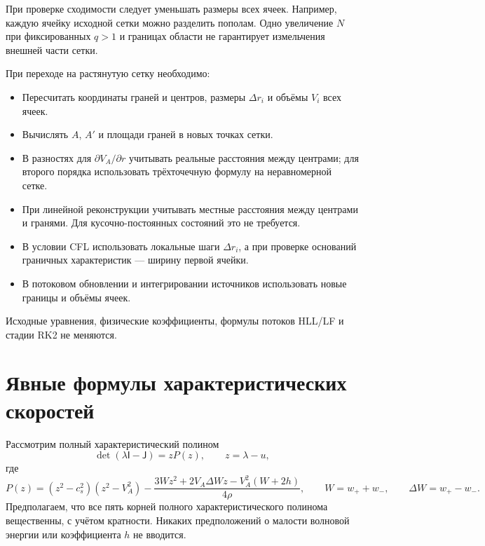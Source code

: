 \documentclass[11pt,a4paper]{article}
\begin{document}
При проверке сходимости следует уменьшать размеры
всех ячеек. Например, каждую ячейку исходной сетки
можно разделить пополам.
Одно увеличение $N$ при фиксированных $q>1$
и границах области не гарантирует измельчения
внешней части сетки.

При переходе на растянутую сетку необходимо:
\begin{itemize}
    \item Пересчитать координаты граней и центров,
    размеры $\Delta r_i$ и объёмы $V_i$ всех ячеек.

    \item Вычислять $A$, $A'$ и площади граней
    в новых точках сетки.

    \item В разностях для $\partial V_A/\partial r$
    учитывать реальные расстояния между центрами;
    для второго порядка использовать трёхточечную
    формулу на неравномерной сетке.

    \item При линейной реконструкции учитывать
    местные расстояния между центрами и гранями.
    Для кусочно-постоянных состояний это не требуется.

    \item В условии CFL использовать локальные шаги
    $\Delta r_i$, а при проверке оснований граничных
    характеристик --- ширину первой ячейки.

    \item В потоковом обновлении и интегрировании
    источников использовать новые границы
    и объёмы ячеек.
\end{itemize}
Исходные уравнения, физические коэффициенты,
формулы потоков HLL/LF и стадии RK2 не меняются.








\newpage
\appendix
\section{Явные формулы характеристических скоростей}
\label{app:characteristic_roots}

Рассмотрим полный характеристический полином
\[
\det(\lambda\mathsf I-\mathsf J)=zP(z),
\qquad z=\lambda-u,
\]
где
\[
P(z)
=
(z^2-c_s^2)(z^2-V_A^2)
-\frac{
3Wz^2+2V_A\Delta Wz-V_A^2(W+2h)
}{4\rho},
\qquad
W=w_++w_-,
\qquad
\Delta W=w_+-w_-.
\]
Предполагаем, что все пять корней полного характеристического
полинома вещественны, с учётом кратности.
Никаких предположений о малости волновой энергии
или коэффициента $h$ не вводится.
\end{document}
